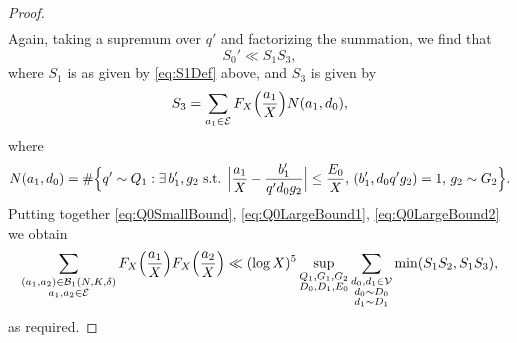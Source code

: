 \documentclass[10pt]{amsart}
\theoremstyle{plain}
\numberwithin{sblmm}{thrm}
\numberwithin{equation}{section}
\begin{document}
\begin{proof}
\begin{align*}
\end{align*}
Again, taking a supremum over $q'$ and factorizing the summation, we find that
\begin{equation}
S_0'\ll S_1 S_3,
\label{eq:Q0LargeBound2}
\end{equation}
%
where $S_1$ is as given by \eqref{eq:S1Def} above, and $S_3$ is given by
%
\begin{equation}
S_3=\sum_{a_1\in\mathcal{E}}F_X\Bigl(\frac{a_1}{X}\Bigr)N(a_1,d_0),\label{eq:S3Def}
\end{equation}
%
where
\begin{equation*}
N(a_1,d_0)=\#\Bigl\{q'\sim Q_1:\exists\, b_1',g_2\text{ s.t. }\Bigl|\frac{a_1}{X}-\frac{b_1'}{q' d_0 g_2}\Bigr|\le \frac{E_0}{X},\,(b_1',d_0 q'g_2)=1,\,g_2\sim G_2\Bigr\}.
\end{equation*}
Putting together \eqref{eq:Q0SmallBound}, \eqref{eq:Q0LargeBound1}, \eqref{eq:Q0LargeBound2} we obtain
\[
\sum_{\substack{(a_1,a_2)\in\mathcal{B}_1(N,K,\delta) \\ a_1,a_2\in\mathcal{E} }}F_X\Bigl(\frac{a_1}{X}\Bigr)F_X\Bigl(\frac{a_2}{X}\Bigr)\ll (\log{X})^5\sup_{\substack{Q_1,G_1,G_2\\ D_0,D_1,E_0}}\sum_{\substack{d_0,d_1\in\mathcal{V}\\ d_0\sim D_0\\ d_1\sim D_1}} \min(S_1S_2,S_1S_3),
\]
as required.
\end{proof}
\end{document}
